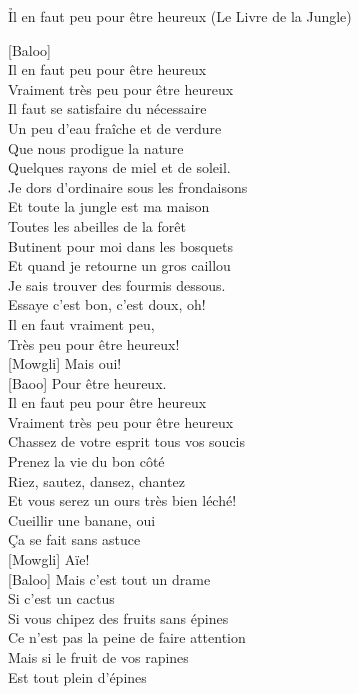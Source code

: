 \documentclass{novel}
\begin{document}
\newpage
\normalsize
\h*{Il en faut peu pour être heureux (Le Livre de la Jungle)}
\begin{multicols}{2}

{[Baloo]} \\
Il en faut peu pour être heureux \\
Vraiment très peu pour être heureux \\
Il faut se satisfaire du nécessaire \\
Un peu d'eau fraîche et de verdure \\
Que nous prodigue la nature \\
Quelques rayons de miel et de soleil. \\
Je dors d'ordinaire sous les frondaisons \\
Et toute la jungle est ma maison \\
Toutes les abeilles de la forêt \\
Butinent pour moi dans les bosquets \\
Et quand je retourne un gros caillou \\
Je sais trouver des fourmis dessous. \\
Essaye c'est bon, c'est doux, oh! \\
Il en faut vraiment peu, \\
Très peu pour être heureux! \\
{[Mowgli]} Mais oui! \\
{[Baoo]} Pour être heureux. \\
Il en faut peu pour être heureux \\
Vraiment très peu pour être heureux \\
Chassez de votre esprit tous vos soucis \\
Prenez la vie du bon côté \\
Riez, sautez, dansez, chantez \\
Et vous serez un ours très bien léché! \\
Cueillir une banane, oui \\
Ça se fait sans astuce \\
{[Mowgli]} Aïe! \\
{[Baloo]} Mais c'est tout un drame \\
Si c'est un cactus \\
Si vous chipez des fruits sans épines \\
Ce n'est pas la peine de faire attention \\
Mais si le fruit de vos rapines \\
Est tout plein d'épines \\

\end{multicols}
\end{document}

